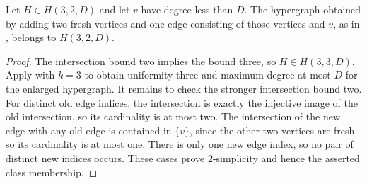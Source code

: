 \begin{helper}
Let $H\in H(3,2,D)$ and let $v$ have degree less than $D$.
The hypergraph obtained by adding two fresh vertices and one edge consisting
of those vertices and $v$, as in ,
belongs to $H(3,2,D)$.
\end{helper}
\begin{proof}
The intersection bound two implies the bound three, so $H\in H(3,3,D)$.
Apply  with $k=3$ to obtain
uniformity three and maximum degree at most $D$ for the enlarged hypergraph.
It remains to check the stronger intersection bound two. For distinct old
edge indices, the intersection is exactly the injective image of the old
intersection, so its cardinality is at most two. The intersection of the
new edge with any old edge is contained in $\{v\}$, since the other two
vertices are fresh, so its cardinality is at most one. There is only one
new edge index, so no pair of distinct new indices occurs. These cases
prove 2-simplicity and hence the asserted class membership.
\end{proof}
